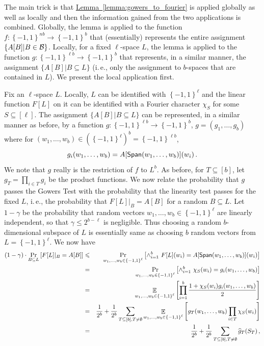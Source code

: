\documentclass[11pt]{article}
\numberwithin{equation}{section}
\theoremstyle{definition}
\theoremstyle{plain}
\newcommand{\ie}{i.\,e.}
\newcommand{\expref}[2]{\hyperref[#2]{#1~\ref{#2}}}
\newcommand\set[1]{{\left\{ #1 \right\}}}
\newcommand\Prob[2]{{\Pr_{#1}\left[ {#2} \right]}}
\newcommand\Expect[2]{{\mathop{\mathbb{E}}_{#1}\left[ {#2} \right]}}
\newcommand\cube[1]{ { \set{-1,1}^{#1} } }
\renewcommand\leq{\leqslant}
\begin{document}
The main trick is that \expref{Lemma}{lemma:gowers_to_fourier} is applied globally as well
as locally and then the information gained from the
two applications is combined.
Globally, the lemma is applied to the
function $f: \cube{nb} \to \cube{b}$ that (essentially) represents the entire assignment $\{A[B] | B \in {\cal B}\}$. Locally, for
a fixed $\ell$-space $L$,
the lemma is applied to the function $g: \cube{\ell b} \to \cube{b}$
that represents, in a similar manner, the assignment  $\{A[B] | B \subseteq L\}$ (\ie, only the assignment to $b$-spaces
that are contained in $L$). We present the local application first.

Fix an $\ell$-space $L$. Locally, $L$ can be identified with $\cube{\ell}$ and the linear function $F[L]$ on it can be
identified with a Fourier character $\chi_S$ for some $S \subseteq [\ell]$. The assignment  $\{A[B] | B \subseteq L\}$
can be represented, in a similar manner as before, by a function $g: \cube{\ell b} \to \cube{b}$, $g = (g_1,\ldots,g_b)$
where for $(w_1, \ldots, w_b) \in (\cube{\ell})^b = \cube{\ell b}$,
 $$ g_i (w_1, \ldots, w_b)  =  A[{\sf Span} (w_1, \ldots, w_b)  ] (w_i)\,.  $$%
We note that $g$ really is the restriction of $f$ to $L^b$.
As before, for $T \subseteq [b]$, let $g_T = \prod_{i\in T} g_i$ be the product functions.
We now relate the probability that $g$ passes the Gowers Test with the probability that the linearity test passes for
the fixed $L$, \ie, the probability that $F[L]|_B = A[B]$  for a random $B \subseteq L$. Let $1-\gamma$ be the probability
that random vectors $w_1, \ldots, w_b \in \cube{\ell}$ are linearly independent, so that $\gamma \leq 2^{b-\ell}$ is
negligible. Thus choosing a random $b$-dimensional subspace of $L$ is essentially same as choosing $b$ random vectors from $L = \cube{\ell}$.
We now have
\begin{eqnarray*}
(1-\gamma) \cdot \Prob{B \subseteq L}{F[L]|_B = A[B]} & \leq &
    \Prob{w_1,\ldots, w_b \in \cube{\ell}}{ \wedge_{i=1}^b   ~F[L](w_i) = A[{\sf Span}(w_1,\ldots, w_b)](w_i) } \\
    & = &   \Prob{w_1,\ldots, w_b \in \cube{\ell}}{ \wedge_{i=1}^b   ~\chi_S(w_i) = g_i(w_1,\ldots, w_b) }\\
    & = &  \Expect{w_1,\ldots, w_b \in \cube{\ell}} {\prod_{i=1}^b \frac{1+\chi_S(w_i) g_i(w_1,\ldots, w_b) }{2} } \\
    & = &  \frac{1}{2^b} + \frac{1}{2^b} \sum_{T \subseteq [b], T \neq  \emptyset } \Expect{w_1,\ldots, w_b \in \cube{\ell}}{ g_T (w_1,\ldots, w_b) \prod_{i \in T}\chi_S(w_i)  }\\
     & = &  \frac{1}{2^b} + \frac{1}{2^b} \sum_{T \subseteq [b], T \neq  \emptyset }  \widehat{g}_T (S_T)\,,%
\end{eqnarray*}
\end{document}
